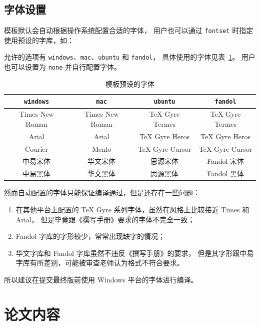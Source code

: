 \documentclass[a4paper]{ltxdoc}
\makeatletter
\DeclareRobustCommand\opt{\texttt}
\def\DescribeOption{\leavevmode\@bsphack\begingroup\MakePrivateLetters
  \Describe@Option}
\def\Describe@Option#1{\endgroup
              \marginpar{\raggedleft\PrintDescribeOption{#1}}%
              \SpecialEnvIndex{#1}\@esphack\ignorespaces}
\makeatother
\begin{document}
\subsection{字体设置}
模板默认会自动根据操作系统配置合适的字体，
\DescribeOption{fontset}
用户也可以通过 \opt{fontset} 时指定使用预设的字库，如：
允许的选项有 \opt{windows}、\opt{mac}、\opt{ubuntu} 和 \opt{fandol}，
具体使用的字体见表~\ref{tab:fontset}。
用户也可以设置为 \opt{none} 并自行配置字体。

\begin{table}[htb]
  \centering
  \caption{模板预设的字体}
  \label{tab:fontset}
  \begin{tabular}{cccc}
    \toprule
    \opt{windows} & \opt{mac}    & \opt{ubuntu} & \opt{fandol} \\
    \midrule
    Times New Roman  & Times New Roman & TeX Gyre Termes & TeX Gyre Termes \\
    Arial            & Arial           & TeX Gyre Heros  & TeX Gyre Heros  \\
    Courier          & Menlo           & TeX Gyre Cursor & TeX Gyre Cursor \\
    中易宋体         & 华文宋体        & 思源宋体        & Fandol 宋体     \\
    中易黑体         & 华文黑体        & 思源黑体        & Fandol 黑体     \\
    \bottomrule
  \end{tabular}
\end{table}

然而自动配置的字体只能保证编译通过，但是还存在一些问题：
\begin{enumerate}
  \item 在其他平台上配置的 TeX Gyre 系列字体，虽然在风格上比较接近 Times 和 Arial，
    但是毕竟跟《撰写手册》要求的字体不完全一致；
  \item Fandol 字库的字形较少，常常出现缺字的情况；
  \item 华文字库和 Fandol 字库虽然不违反《撰写手册》的要求，
    但是其字形跟中易字库有所差别，可能被审查老师认为格式不符合要求。
\end{enumerate}

所以建议在提交最终版前使用 Windows 平台的字体进行编译。



\section{论文内容}
\end{document}
